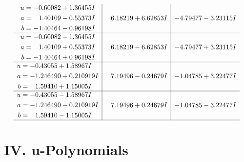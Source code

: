 \documentclass[1p]{elsarticle_modified}
\theoremstyle{definition}
\begin{document}
$$\begin{array}{c|c|c}
\begin{aligned}
u &= -0.60082 + 1.36455 I \\
a &= \phantom{-}1.40109 - 0.55373 I \\
b &= -1.40464 - 0.96198 I\end{aligned}
 & \phantom{-}6.18219 + 6.62853 I & -4.79477 - 3.23115 I \\ \hline\begin{aligned}
u &= -0.60082 - 1.36455 I \\
a &= \phantom{-}1.40109 + 0.55373 I \\
b &= -1.40464 + 0.96198 I\end{aligned}
 & \phantom{-}6.18219 - 6.62853 I & -4.79477 + 3.23115 I \\ \hline\begin{aligned}
u &= -0.43055 + 1.58967 I \\
a &= -1.246490 + 0.210919 I \\
b &= \phantom{-}1.59410 + 1.15005 I\end{aligned}
 & \phantom{-}7.19496 - 0.24679 I & -1.04785 + 3.22477 I \\ \hline\begin{aligned}
u &= -0.43055 - 1.58967 I \\
a &= -1.246490 - 0.210919 I \\
b &= \phantom{-}1.59410 - 1.15005 I\end{aligned}
 & \phantom{-}7.19496 + 0.24679 I & -1.04785 - 3.22477 I\\
 \hline 
 \end{array}$$\newpage
\newpage\renewcommand{\arraystretch}{1}
\centering \section*{ IV. u-Polynomials}
\end{document}
